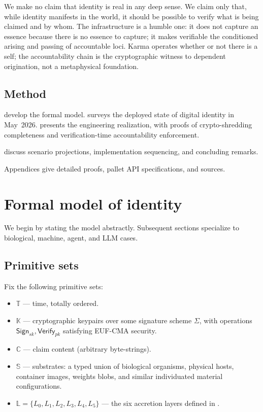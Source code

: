 \documentclass[11pt,a4paper,parskip=half-,DIV=12,headings=standardclasses]{scrartcl}
\theoremstyle{ncthm}
\theoremstyle{ncdef}
\newcommand{\Sign}{\mathsf{Sign}}
\newcommand{\Verify}{\mathsf{Verify}}
\newif\ifpublicrelease
\begin{document}
We make no claim that identity is real in any deep sense. We claim
only that, while identity manifests in the world, it should be
possible to verify what is being claimed and by whom. The
infrastructure is a humble one: it does not capture an essence
because there is no essence to capture; it makes verifiable the
conditioned arising and passing of accountable loci. Karma operates
whether or not there is a self; the accountability chain is the
cryptographic witness to dependent origination, not a metaphysical
foundation.

\subsection{Method}

develop the formal model.  surveys the deployed
state of digital identity in May~2026. 
presents the engineering realization, with proofs of crypto-shredding
completeness and verification-time accountability enforcement.
\ifpublicrelease
\Cref{sec:future,sec:conclusion} discuss scenario projections and
concluding remarks.
\else
{} discuss scenario
projections, implementation sequencing, and concluding remarks.
\fi
Appendices give detailed proofs, pallet API specifications, and
sources.

\section{Formal model of identity}\label{sec:formal-model}

We begin by stating the model abstractly. Subsequent sections
specialize to biological, machine, agent, and LLM cases.

\subsection{Primitive sets}

Fix the following primitive sets:
\begin{itemize}
\item $\mathbb{T}$ --- time, totally ordered.
\item $\mathbb{K}$ --- cryptographic keypairs over some signature
  scheme $\Sigma$, with operations
  $\Sign_{sk}, \Verify_{pk}$ satisfying EUF-CMA security.
\item $\mathbb{C}$ --- claim content (arbitrary byte-strings).
\item $\mathbb{S}$ --- substrates: a typed union of biological organisms,
  physical hosts, container images, weights blobs, and similar
  individuated material configurations.
\item $\mathbb{L} = \{L_0, L_1, L_2, L_3, L_4, L_5\}$ --- the six
  accretion layers defined in .
\end{itemize}
\end{document}
